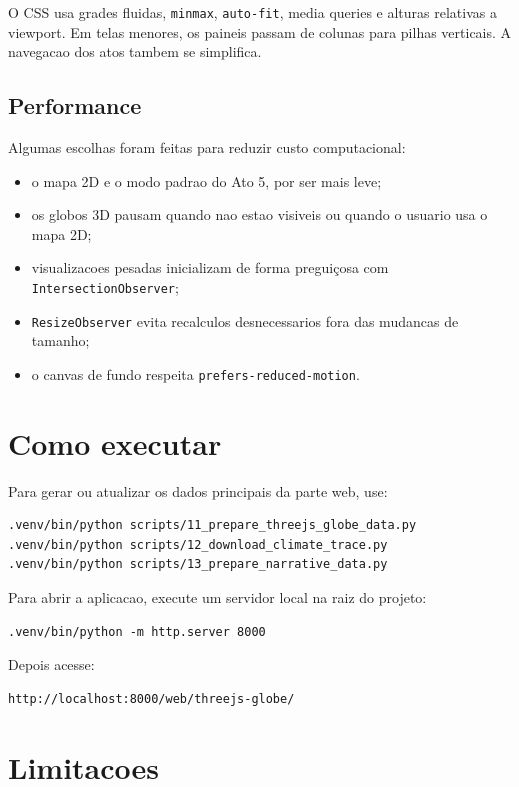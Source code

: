 \documentclass[12pt,a4paper]{article}
\begin{document}
O CSS usa grades fluidas, \texttt{minmax}, \texttt{auto-fit}, media queries e alturas relativas a viewport. Em telas menores, os paineis passam de colunas para pilhas verticais. A navegacao dos atos tambem se simplifica.

\subsection{Performance}

Algumas escolhas foram feitas para reduzir custo computacional:

\begin{itemize}
  \item o mapa 2D e o modo padrao do Ato 5, por ser mais leve;
  \item os globos 3D pausam quando nao estao visiveis ou quando o usuario usa o mapa 2D;
  \item visualizacoes pesadas inicializam de forma preguiçosa com \texttt{IntersectionObserver};
  \item \texttt{ResizeObserver} evita recalculos desnecessarios fora das mudancas de tamanho;
  \item o canvas de fundo respeita \texttt{prefers-reduced-motion}.
\end{itemize}

\section{Como executar}

Para gerar ou atualizar os dados principais da parte web, use:

\begin{verbatim}
.venv/bin/python scripts/11_prepare_threejs_globe_data.py
.venv/bin/python scripts/12_download_climate_trace.py
.venv/bin/python scripts/13_prepare_narrative_data.py
\end{verbatim}

Para abrir a aplicacao, execute um servidor local na raiz do projeto:

\begin{verbatim}
.venv/bin/python -m http.server 8000
\end{verbatim}

Depois acesse:

\begin{verbatim}
http://localhost:8000/web/threejs-globe/
\end{verbatim}

\section{Limitacoes}
\end{document}
